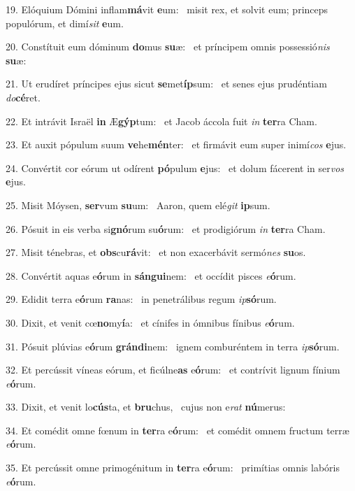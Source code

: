 19. Elóquium Dómini inflam\textbf{má}vit \textbf{e}um: \ast\  misit rex, et solvit eum; princeps populórum, et dimí\textit{sit} \textbf{e}um.\

20. Constítuit eum dóminum \textbf{do}mus \textbf{su}æ: \ast\  et príncipem omnis possessió\textit{nis} \textbf{su}æ:\

21. Ut erudíret príncipes ejus sicut \textbf{se}met\textbf{íp}sum: \ast\  et senes ejus prudéntiam \textit{do}\textbf{cé}ret.\

22. Et intrávit Israël \textbf{in} Æ\textbf{gýp}tum: \ast\  et Jacob áccola fuit \textit{in} \textbf{ter}ra Cham.\

23. Et auxit pópulum suum \textbf{ve}he\textbf{mén}ter: \ast\  et firmávit eum super inimí\textit{cos} \textbf{e}jus.\

24. Convértit cor eórum ut odírent \textbf{pó}pulum \textbf{e}jus: \ast\  et dolum fácerent in ser\textit{vos} \textbf{e}jus.\

25. Misit Móysen, \textbf{ser}vum \textbf{su}um: \ast\  Aaron, quem elé\textit{git} \textbf{ip}sum.\

26. Pósuit in eis verba si\textbf{gnó}rum su\textbf{ó}rum: \ast\  et prodigiórum \textit{in} \textbf{ter}ra Cham.\

27. Misit ténebras, et \textbf{obs}cu\textbf{rá}vit: \ast\  et non exacerbávit sermó\textit{nes} \textbf{su}os.\

28. Convértit aquas e\textbf{ó}rum in \textbf{sán}\textbf{gui}nem: \ast\  et occídit pisces \textit{e}\textbf{ó}rum.\

29. Edidit terra e\textbf{ó}rum \textbf{ra}nas: \ast\  in penetrálibus regum \textit{ip}\textbf{só}rum.\

30. Dixit, et venit cœ\textbf{no}my\textbf{í}a: \ast\  et cínifes in ómnibus fínibus \textit{e}\textbf{ó}rum.\

31. Pósuit plúvias e\textbf{ó}rum \textbf{grán}\textbf{di}nem: \ast\  ignem comburéntem in terra \textit{ip}\textbf{só}rum.\

32. Et percússit víneas eórum, et ficúlne\textbf{as} e\textbf{ó}rum: \ast\  et contrívit lignum fínium \textit{e}\textbf{ó}rum.\

33. Dixit, et venit lo\textbf{cús}ta, et \textbf{bru}chus, \ast\  cujus non e\textit{rat} \textbf{nú}merus:\

34. Et comédit omne fœnum in \textbf{ter}ra e\textbf{ó}rum: \ast\  et comédit omnem fructum terræ \textit{e}\textbf{ó}rum.\

35. Et percússit omne primogénitum in \textbf{ter}ra e\textbf{ó}rum: \ast\  primítias omnis labóris \textit{e}\textbf{ó}rum.\

